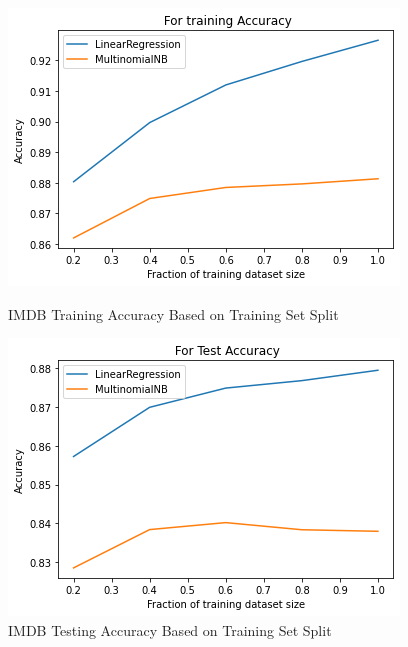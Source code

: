 \documentclass[11pt]{homework}
\begin{document}
\begin{figure}[h!]
  \centering
  \begin{minipage}[h]{0.3\textwidth}
    \includegraphics[width=\textwidth]{imdb-varying-train-set-size-train-accuracy.png}
    \caption{IMDB Training Accuracy Based on Training Set Split}\label{imdb-training-split-train}
  \end{minipage}
\hspace{1.5cm}
   \begin{minipage}[h]{0.3\textwidth}
    \includegraphics[width=\textwidth]{imdb-varying-train-set-size-test-accuracy.png}
    \caption{IMDB Testing Accuracy Based on Training Set Split}\label{imdb-training-split-test}
  \end{minipage}
\end{figure}
\end{document}
